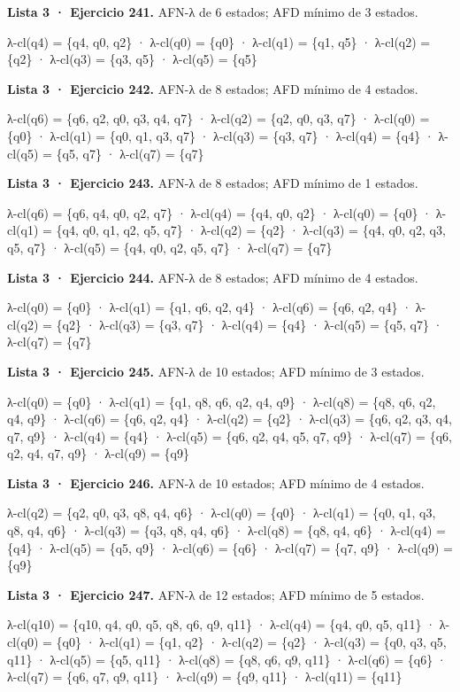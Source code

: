 \textbf{Lista 3 · Ejercicio 241.} AFN-λ de 6 estados; AFD mínimo de 3 estados.

λ-cl(q4) = \{q4, q0, q2\} · λ-cl(q0) = \{q0\} · λ-cl(q1) = \{q1, q5\} · λ-cl(q2) = \{q2\} · λ-cl(q3) = \{q3, q5\} · λ-cl(q5) = \{q5\}

\textbf{Lista 3 · Ejercicio 242.} AFN-λ de 8 estados; AFD mínimo de 4 estados.

λ-cl(q6) = \{q6, q2, q0, q3, q4, q7\} · λ-cl(q2) = \{q2, q0, q3, q7\} · λ-cl(q0) = \{q0\} · λ-cl(q1) = \{q0, q1, q3, q7\} · λ-cl(q3) = \{q3, q7\} · λ-cl(q4) = \{q4\} · λ-cl(q5) = \{q5, q7\} · λ-cl(q7) = \{q7\}

\textbf{Lista 3 · Ejercicio 243.} AFN-λ de 8 estados; AFD mínimo de 1 estados.

λ-cl(q6) = \{q6, q4, q0, q2, q7\} · λ-cl(q4) = \{q4, q0, q2\} · λ-cl(q0) = \{q0\} · λ-cl(q1) = \{q4, q0, q1, q2, q5, q7\} · λ-cl(q2) = \{q2\} · λ-cl(q3) = \{q4, q0, q2, q3, q5, q7\} · λ-cl(q5) = \{q4, q0, q2, q5, q7\} · λ-cl(q7) = \{q7\}

\textbf{Lista 3 · Ejercicio 244.} AFN-λ de 8 estados; AFD mínimo de 4 estados.

λ-cl(q0) = \{q0\} · λ-cl(q1) = \{q1, q6, q2, q4\} · λ-cl(q6) = \{q6, q2, q4\} · λ-cl(q2) = \{q2\} · λ-cl(q3) = \{q3, q7\} · λ-cl(q4) = \{q4\} · λ-cl(q5) = \{q5, q7\} · λ-cl(q7) = \{q7\}

\textbf{Lista 3 · Ejercicio 245.} AFN-λ de 10 estados; AFD mínimo de 3 estados.

λ-cl(q0) = \{q0\} · λ-cl(q1) = \{q1, q8, q6, q2, q4, q9\} · λ-cl(q8) = \{q8, q6, q2, q4, q9\} · λ-cl(q6) = \{q6, q2, q4\} · λ-cl(q2) = \{q2\} · λ-cl(q3) = \{q6, q2, q3, q4, q7, q9\} · λ-cl(q4) = \{q4\} · λ-cl(q5) = \{q6, q2, q4, q5, q7, q9\} · λ-cl(q7) = \{q6, q2, q4, q7, q9\} · λ-cl(q9) = \{q9\}

\textbf{Lista 3 · Ejercicio 246.} AFN-λ de 10 estados; AFD mínimo de 4 estados.

λ-cl(q2) = \{q2, q0, q3, q8, q4, q6\} · λ-cl(q0) = \{q0\} · λ-cl(q1) = \{q0, q1, q3, q8, q4, q6\} · λ-cl(q3) = \{q3, q8, q4, q6\} · λ-cl(q8) = \{q8, q4, q6\} · λ-cl(q4) = \{q4\} · λ-cl(q5) = \{q5, q9\} · λ-cl(q6) = \{q6\} · λ-cl(q7) = \{q7, q9\} · λ-cl(q9) = \{q9\}

\textbf{Lista 3 · Ejercicio 247.} AFN-λ de 12 estados; AFD mínimo de 5 estados.

λ-cl(q10) = \{q10, q4, q0, q5, q8, q6, q9, q11\} · λ-cl(q4) = \{q4, q0, q5, q11\} · λ-cl(q0) = \{q0\} · λ-cl(q1) = \{q1, q2\} · λ-cl(q2) = \{q2\} · λ-cl(q3) = \{q0, q3, q5, q11\} · λ-cl(q5) = \{q5, q11\} · λ-cl(q8) = \{q8, q6, q9, q11\} · λ-cl(q6) = \{q6\} · λ-cl(q7) = \{q6, q7, q9, q11\} · λ-cl(q9) = \{q9, q11\} · λ-cl(q11) = \{q11\}

